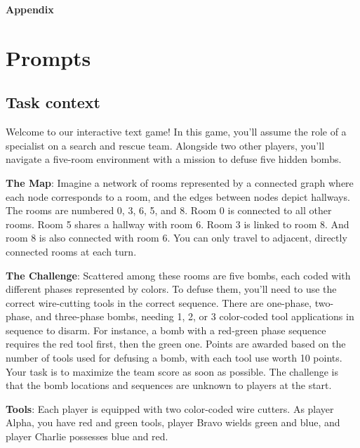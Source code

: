 \documentclass[11pt]{article}
\begin{document}



% 




\appendix

\newpage
\begin{center}
\textbf{{\Large Appendix}}
\end{center}

\section{Prompts}

\subsection{Task context}
Welcome to our interactive text game! In this game, you'll assume the role of a specialist on a search and rescue team. Alongside two other players, you'll navigate a five-room environment with a mission to defuse five hidden bombs.

\textbf{The Map}: Imagine a network of rooms represented by a connected graph where each node corresponds to a room, and the edges between nodes depict hallways. The rooms are numbered 0, 3, 6, 5, and 8. Room 0 is connected to all other rooms. Room 5 shares a hallway with room 6. Room 3 is linked to room 8. And room 8 is also connected with room 6. You can only travel to adjacent, directly connected rooms at each turn.

\textbf{The Challenge}: Scattered among these rooms are five bombs, each coded with different phases represented by colors. To defuse them, you'll need to use the correct wire-cutting tools in the correct sequence. There are one-phase, two-phase, and three-phase bombs, needing 1, 2, or 3 color-coded tool applications in sequence to disarm. For instance, a bomb with a red-green phase sequence requires the red tool first, then the green one. Points are awarded based on the number of tools used for defusing a bomb, with each tool use worth 10 points. Your task is to maximize the team score as soon as possible. The challenge is that the bomb locations and sequences are unknown to players at the start.

\textbf{Tools}: Each player is equipped with two color-coded wire cutters. As player Alpha, you have red and green tools, player Bravo wields green and blue, and player Charlie possesses blue and red.
\end{document}
